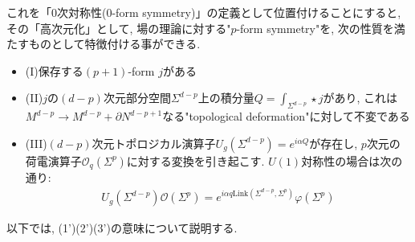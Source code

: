 \documentclass{ltjsarticle}
\theoremstyle{mystyle} %
\numberwithin{equation}{section}
\begin{document}
これを「$0$次対称性($0$-form symmetry)」の定義として位置付けることにすると, 
その「高次元化」として, 場の理論に対する"$p$-form symmetry"を, 次の性質を満たすものとして特徴付ける事ができる. 
\begin{itemize}
    \item (I)保存する$(p+1)$-form $j$がある
    \item (II)$j$の$(d-p)$次元部分空間$\Sigma^{d-p}$上の積分量$Q=\int_{\Sigma^{d-p}}\star j$があり, これは$M^{d-p}\to M^{d-p} + \partial N^{d-p+1}$なる"topological deformation"に対して不変である
    \item (III)$(d-p)$次元トポロジカル演算子$U_g(\Sigma^{d-p})=e^{i\alpha Q}$が存在し, $p$次元の荷電演算子$\mathcal{O}_q(\Sigma^p)$に対する変換を引き起こす. $U(1)$対称性の場合は次の通り: 
    \begin{align}
        U_g(\Sigma^{d-p}) \mathcal{O}(\Sigma^p) = e^{i\alpha q \mathrm{Link}(\Sigma^{d-p}, \Sigma^p)}\varphi(\Sigma^p)
    \end{align}
\end{itemize}
以下では, (1')(2')(3')の意味について説明する. 
\end{document}
